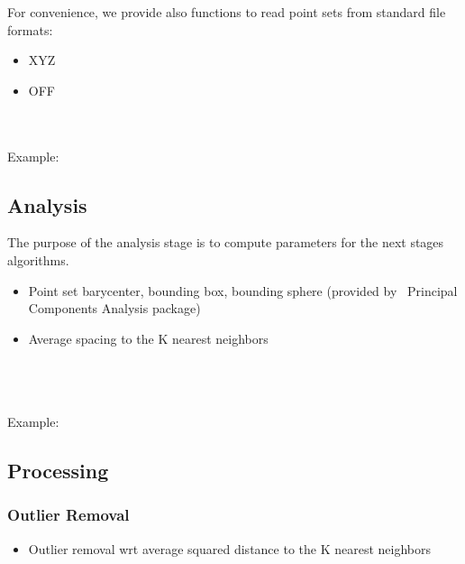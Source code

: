 For convenience, we provide also functions to read point sets from standard file formats:

\begin{itemize}
\item XYZ
\item OFF
\end{itemize}

  \\
  \\

Example:



\subsection{Analysis}

The purpose of the analysis stage is to compute parameters for the next stages algorithms.

\begin{itemize}
\item Point set barycenter, bounding box, bounding sphere (provided by \cgal\ Principal Components Analysis package)
\item Average spacing to the K nearest neighbors
\end{itemize}

  \\
  \\
  \\

Example:



\subsection{Processing}

\subsubsection{Outlier Removal}

\begin{itemize}
\item Outlier removal wrt average squared distance to the K nearest neighbors
\end{itemize}

